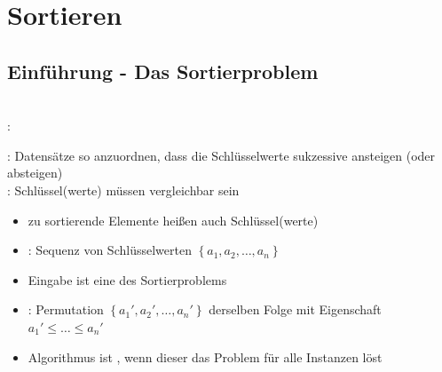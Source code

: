 \documentclass[
    ngerman,
    color=3b,
    dark_mode,
    load_common, %
    summary,
    boxarc,
]{rubos-tuda-template}
\begin{document}
\section{Sortieren}\label{2}\label{Sortieren}
\subsection{Einführung - Das Sortierproblem}\label{2.1}\label{Einfuehrung Sortieren}
\begin{definition}\mbox{}\\
    :
    \begin{center}
        \captionsetup{type=figure}
        \label{fig:folge_von_Datensätzen}
    \end{center}

    :  Datensätze so anzuordnen, dass die Schlüsselwerte sukzessive
    ansteigen (oder absteigen)\\
    : Schlüssel(werte) müssen vergleichbar sein
\end{definition}
\begin{itemize}
    \item zu sortierende Elemente hei\ss{}en auch Schlüssel(werte)
\end{itemize}
\begin{grayInfoBox}[title=Durchführung]
    \begin{itemize}
        \item {}: Sequenz von Schlüsselwerten $\left\{a_1,a_2,\ldots,a_n\right\}$
        \item Eingabe ist eine  des Sortierproblems
        \item {}: Permutation $\left\{a_1',a_2',\ldots,a_n'\right\}$ derselben Folge mit Eigenschaft $a_1'\leq\ldots\leq a_n'$
        \item Algorithmus ist , wenn dieser das Problem für alle Instanzen löst
    \end{itemize}
\end{grayInfoBox}
\end{document}

